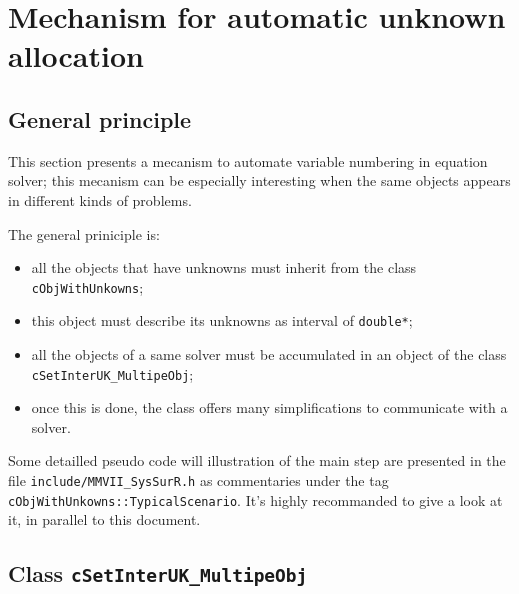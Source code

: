
\section{Mechanism for automatic unknown allocation}

\label{SecAutoUkAlloc}


\subsection{General principle}

This section presents a mecanism to automate variable numbering in 
equation solver; this mecanism can be especially interesting when the same objects 
appears in different kinds of problems.

The general priniciple is:

\begin{itemize}
     \item all the objects that have unknowns must inherit from the class {\tt cObjWithUnkowns};

     \item this object must describe its unknowns as interval of {\tt double*};

     \item  all the objects of a same solver must be accumulated in an object of the class
            {\tt cSetInterUK\_MultipeObj};

      \item once this is done, the class offers many simplifications to communicate with a solver.
     
\end{itemize}


Some detailled pseudo code will illustration of the main step are presented in 
the file  {\tt include/MMVII\_SysSurR.h}  as commentaries under the tag {\tt cObjWithUnkowns::TypicalScenario}.
It's highly recommanded to give a look at it, in parallel to this document.



\subsection{Class {\tt cSetInterUK\_MultipeObj}}

